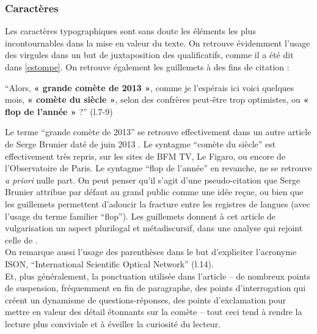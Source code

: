 \documentclass[a4paper,10pt]{article}
\begin{document}
		\subsubsection{Caractères}
			Les caractères typographiques sont sans doute les éléments les plus incontournables dans la mise en valeur du texte. On retrouve évidemment l'usage des virgules dans un but de juxtaposition des qualificatifs, comme il a été dit dans \ref{estompe}. On retrouve également les guillemets à des fins de citation :
			\begin{center}
				\footnotesize
				\begin{minipage}{0.7\textwidth}
					``Alors, \textbf{« grande comète de 2013 »}, comme je l'espérais ici voici quelques mois, \textbf{« comète du siècle »}, selon des confrères peut-être trop optimistes, ou \textbf{« flop de l'année »} ?'' (l.7-9)
				\end{minipage}
			\end{center}
			Le terme ``grande comète de 2013'' se retrouve effectivement dans un autre article de Serge Brunier daté de juin 2013 \cite{Brunier2013}. Le syntagme ``comète du siècle'' est effectivement très repris, sur les sites de BFM TV, Le Figaro, ou encore de l'Observatoire de Paris. Le syntagme ``flop de l'année'' en revanche, ne se retrouve \textit{a priori} nulle part. On peut penser qu'il s'agit d'une pseudo-citation que Serge Brunier attribue par défaut au grand public comme une idée reçue, ou bien que les guillemets permettent d'adoucir la fracture entre les registres de langues (avec l'usage du terme familier ``flop''). Les guillemets donnent à cet article de vulgarisation un aspect plurilogal et métadiscursif, dans une analyse qui rejoint celle de \cite{Toure2000}.\\
			On remarque aussi l'usage des parenthèses dans le but d'expliciter l'acronyme ISON, ``International Scientific Optical Network'' (l.14).\\
			Et, plus généralement, la ponctuation utilisée dans l'article -- de nombreux points de suspension, fréquemment en fin de paragraphe, des points d'interrogation qui créent un dynamisme de questions-réponses, des points d'exclamation pour mettre en valeur des détail étonnants sur la comète -- tout ceci tend à rendre la lecture plus conviviale et à éveiller la curiosité du lecteur.
\end{document}
